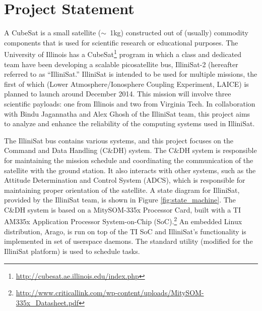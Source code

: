 \section{Project Statement}\label{sec:problem}

A CubeSat is a small satellite ($\sim$~1kg) constructed out of (usually)
commodity components that is used for scientific research or educational
purposes.  The University of Illinois has a
CubeSat\footnote{\url{http://cubesat.ae.illinois.edu/index.php}} program in
which a class and dedicated team have been developing a scalable picosatellite
bus, IlliniSat-2 (hereafter referred to as ``IlliniSat.''  IlliniSat is intended
to be used for multiple missions, the first of which (Lower
Atmosphere/Ionosphere Coupling Experiment, LAICE) is planned to launch around
December 2014.  This mission will involve three scientific payloads: one from
Illinois and two from Virginia Tech.  In collaboration with Bindu Jagannatha and
Alex Ghosh of the IlliniSat team, this project aims to analyze and enhance the
reliability of the computing systems used in IlliniSat.

The IlliniSat bus contains various systems, and this project focuses on the
Command and Data Handling (C\&DH) system.  The C\&DH system is responsible for
maintaining the mission schedule and coordinating the communication of the
satellite with the ground station.  It also interacts with other systems, such
as the Attitude Determination and Control System (ADCS), which is responsible
for maintaining proper orientation of the satellite. A state diagram for
IlliniSat, provided by the IlliniSat team, is shown in Figure
\ref{fig:state_machine}. The C\&DH system is based on a MitySOM-335x Processor
Card, built with a TI AM335x Application Processor System-on-Chip
(SoC).\footnote{\url{http://www.criticallink.com/wp-content/uploads/MitySOM-335x_Datasheet.pdf}}
An embedded Linux distribution, Arago, is run on top of the TI SoC and
IlliniSat's functionality is implemented in set of userspace daemons. The
standard  utility (modified for the IlliniSat platform) is used to
schedule tasks.

